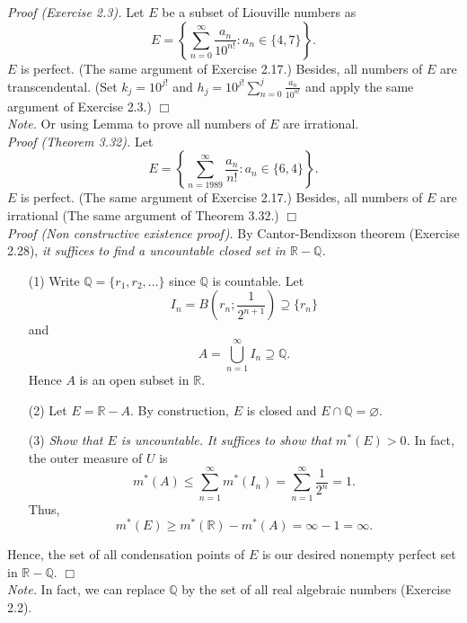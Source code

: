 \documentclass{article}
\begin{document}
\emph{Proof (Exercise 2.3).}
Let $E$ be a subset of Liouville numbers as
$$E = \left\{ \sum_{n=0}^{\infty} \frac{a_n}{10^{n!}} : a_n \in \{4, 7\} \right\}.$$
$E$ is perfect. (The same argument of Exercise 2.17.)
Besides,
all numbers of $E$ are transcendental.
(Set $k_j = 10^{j!}$ and $h_j = 10^{j!} \sum_{n=0}^{j} \frac{a_n}{10^{n!}}$
and apply the same argument of Exercise 2.3.)
$\Box$ \\

\emph{Note.}
Or using Lemma to prove all numbers of $E$ are irrational. \\

\emph{Proof (Theorem 3.32).}
Let
$$E = \left\{ \sum_{n=1989}^{\infty} \frac{a_n}{n!} : a_n \in \{6, 4\} \right\}.$$
$E$ is perfect. (The same argument of Exercise 2.17.)
Besides,
all numbers of $E$ are irrational (The same argument of Theorem 3.32.)
$\Box$ \\

\emph{Proof (Non constructive existence proof).}
By Cantor-Bendixson theorem (Exercise 2.28),
\emph{it suffices to find a uncountable closed set in $\mathbb{R} - \mathbb{Q}$.}
\begin{enumerate}
\item[(1)]
Write $\mathbb{Q} = \{ r_1, r_2, \ldots \}$ since $\mathbb{Q}$ is countable.
Let $$I_n = B\left(r_n;\frac{1}{2^{n+1}}\right) \supseteq \{r_n\}$$
and
$$A = \bigcup_{n=1}^{\infty} I_n \supseteq \mathbb{Q}.$$
Hence $A$ is an open subset in $\mathbb{R}$.
\item[(2)]
Let $E = \mathbb{R} - A$.
By construction, $E$ is closed and $E \cap \mathbb{Q} = \varnothing$.
\item[(3)]
\emph{Show that $E$ is uncountable.}
\emph{It suffices to show that $m^{*}(E) > 0$.}
In fact, the outer measure of $U$ is
$$m^{*}(A) \leq \sum_{n=1}^{\infty} m^{*}(I_n) = \sum_{n=1}^{\infty} \frac{1}{2^n} = 1.$$
Thus,
$$m^{*}(E) \geq m^{*}(\mathbb{R}) - m^{*}(A) = \infty - 1 = \infty.$$
\end{enumerate}
Hence, the set of all condensation points of $E$ is our desired
nonempty perfect set in $\mathbb{R}-\mathbb{Q}$.
$\Box$ \\

\emph{Note.}
In fact, we can replace $\mathbb{Q}$
by the set of all real algebraic numbers (Exercise 2.2). \\\\



\end{document}
